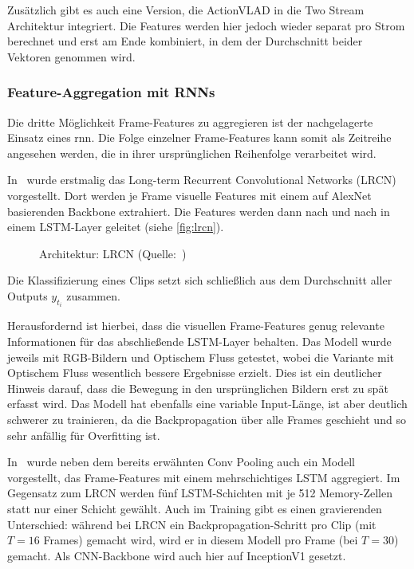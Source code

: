 Zusätzlich gibt es auch eine Version, die ActionVLAD in die Two Stream Architektur integriert.
Die Features werden hier jedoch wieder separat pro Strom berechnet und erst am Ende kombiniert, in dem der Durchschnitt beider Vektoren genommen wird.


\subsubsection{Feature-Aggregation mit RNNs}

Die dritte Möglichkeit Frame-Features zu aggregieren ist der nachgelagerte Einsatz eines \gls{rnn}.
Die Folge einzelner Frame-Features kann somit als Zeitreihe angesehen werden, die in ihrer ursprünglichen Reihenfolge verarbeitet wird.

In~\cite{Donahue14} wurde erstmalig das Long-term Recurrent Convolutional Networks (LRCN) vorgestellt.
Dort werden je Frame visuelle Features mit einem auf AlexNet basierenden Backbone extrahiert.
Die Features werden dann nach und nach in einem LSTM-Layer geleitet (siehe \autoref{fig:lrcn}).

\begin{figure}[h!]
    \centering
    \caption{Architektur: LRCN (Quelle:~\cite{Donahue14})}
    \label{fig:lrcn}
\end{figure}

Die Klassifizierung eines Clips setzt sich schließlich aus dem Durchschnitt aller Outputs $y_{t_i}$ zusammen.

Herausfordernd ist hierbei, dass die visuellen Frame-Features genug relevante Informationen für das abschließende LSTM-Layer behalten.
Das Modell wurde jeweils mit RGB-Bildern und Optischem Fluss getestet, wobei die Variante mit Optischem Fluss wesentlich bessere Ergebnisse erzielt.
Dies ist \ua ein deutlicher Hinweis darauf, dass die Bewegung in den ursprünglichen Bildern erst zu spät erfasst wird.
Das Modell hat ebenfalls eine variable Input-Länge, ist aber deutlich schwerer zu trainieren, da die Backpropagation über alle Frames geschieht und so sehr anfällig für Overfitting ist.

In~\cite{Ng15} wurde neben dem bereits erwähnten Conv Pooling auch ein Modell vorgestellt, das Frame-Features mit einem mehrschichtiges LSTM aggregiert.
Im Gegensatz zum LRCN werden fünf LSTM-Schichten mit je 512 Memory-Zellen statt nur einer Schicht gewählt.
Auch im Training gibt es einen gravierenden Unterschied:
während bei LRCN ein Backpropagation-Schritt pro Clip (mit $T = 16$ Frames) gemacht wird, wird er in diesem Modell pro Frame (bei $T = 30$) gemacht.
Als CNN-Backbone wird auch hier auf InceptionV1 gesetzt.

